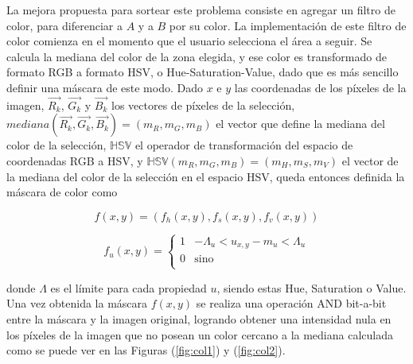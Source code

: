 La mejora propuesta para sortear este problema consiste en agregar un filtro de color, para diferenciar a $A$ y a $B$ por su color. La implementación de este filtro de color comienza en el momento que el usuario selecciona el área a seguir. Se calcula la mediana del color de la zona elegida, y ese color es transformado de formato RGB a formato HSV, o Hue-Saturation-Value, dado que es más sencillo definir una máscara de este modo. Dado $x$ e $y$ las coordenadas de los píxeles de la imagen, $\vec{R_k}$, $\vec{G_k}$ y $\vec{B_k}$ los vectores de píxeles de la selección, $mediana(\vec{R_k}, \vec{G_k}, \vec{B_k}) = (m_R, m_G, m_B)$ el vector que define la mediana del color de la selección, $\mathbb{HSV}$ el operador de transformación del espacio de coordenadas RGB a HSV, y $\mathbb{HSV}(m_R, m_G, m_B) = (m_H, m_S, m_V)$ el vector de la mediana del color de la selección en el espacio HSV, queda entonces definida la máscara de color como

\begin{equation}
f(x, y) = (f_h(x, y), f_s(x, y), f_v(x, y))
\end{equation}

\begin{equation}
f_{u}(x,y) = \left\{
\begin{array}{ll}


      1 & -\Lambda_u < u_{x, y} - m_u < \Lambda_u \\
      
      
      
      0 & \text{sino} \\
      
      
\end{array} 
\right.
\end{equation}

donde $\Lambda$ es el límite para cada propiedad $u$, siendo estas Hue, Saturation o Value. Una vez obtenida la máscara $f(x, y)$ se realiza una operación AND bit-a-bit entre la máscara y la imagen original, logrando obtener una intensidad nula en los píxeles de la imagen que no posean un color cercano a la mediana calculada como se puede ver en las Figuras (\ref{fig:col1}) y (\ref{fig:col2}).

